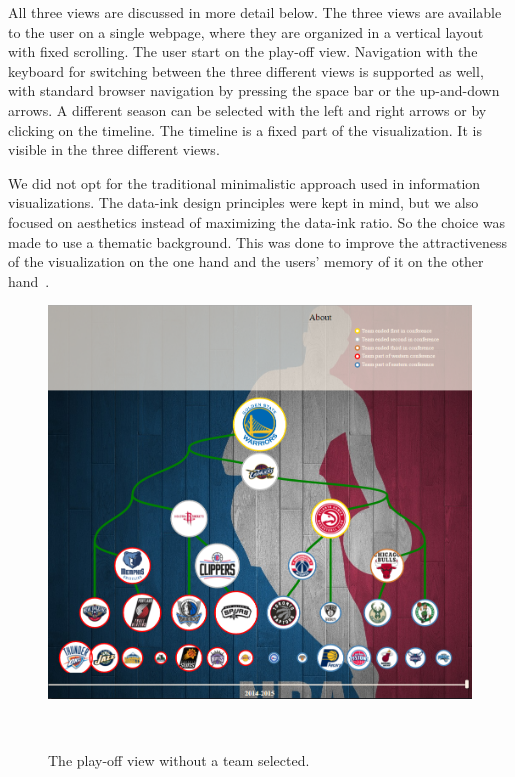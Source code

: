 \documentclass[]{sigchi}
\begin{document}
All three views are discussed in more detail below. The three views are
available to the user on a single webpage, where they are organized in a 
vertical layout with fixed scrolling. The user start on the play-off view. Navigation with the keyboard for switching between the three different views is 
supported as well, with standard browser navigation by pressing the space bar or
the up-and-down arrows. A different season can be selected with the left and right
arrows or by clicking on the timeline. The timeline is a fixed part of the
visualization. It is visible in the three different views. 

We did not opt for the traditional minimalistic approach used in information 
visualizations. The data-ink design principles were kept in mind, but we also 
focused on aesthetics instead of maximizing the data-ink ratio. So the choice 
was made to use a thematic background. This was done to improve the 
attractiveness of the visualization on the one hand and the users' memory of 
it on the other hand~\cite{aesthetics}. 

\begin{figure}
\centering
  \includegraphics[width=1.0\columnwidth]{figures/playoffviewwithcontext}
  \caption{The play-off view without a team selected.}~\label{fig:playoffviewnoteam}
\end{figure}
\end{document}
